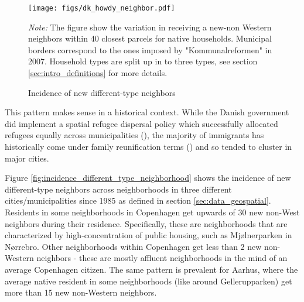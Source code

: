 \documentclass[main.tex]{subfiles}
\begin{document}
\begin{figure}[H]
    \centering
    \caption{Incidence of new different-type neighbors}
    \texttt{[image: figs/dk\_howdy\_neighbor.pdf]}
    \label{fig:incidence_different_type_dk}
\begin{tablenotes}
\item \footnotesize \textit{Note:} The figure show the variation in receiving a new-non Western neighbors within 40 closest parcels for native households. Municipal borders correspond to the ones imposed by "Kommunalreformen" in 2007. Household types are split up in to three types, see section \ref{sec:intro_definitions} for more details.
\end{tablenotes}
\end{figure}

This pattern makes sense in a historical context. While the Danish government did implement a spatial refugee dispersal policy which successfully allocated refugees equally across municipalities (\textcite{hasager2024sick_poor_neighborhood}), the majority of immigrants has historically come under family reunification terms (\textcite{dst_hvor_bor_indvandrere}) and so tended to cluster in major cities. 

Figure \ref{fig:incidence_different_type_neighborhood} shows the incidence of new different-type neighbors across neighborhoods in three different cities/municipalities since 1985 as defined in section \ref{sec:data_geospatial}. Residents in some neighborhoods in Copenhagen get upwards of 30 new non-West neighbors during their residence. Specifically, these are neighborhoods that are characterized by high-concentration of public housing, such as Mjølnerparken in Nørrebro. Other neighborhoods within Copenhagen get less than 2 new non-Western neighbors - these are mostly affluent neighborhoods in the mind of an average Copenhagen citizen. The same pattern is prevalent for Aarhus, where the average native resident in some neighborhoods (like around Gellerupparken) get more than 15 new non-Western neighbors.
\end{document}
